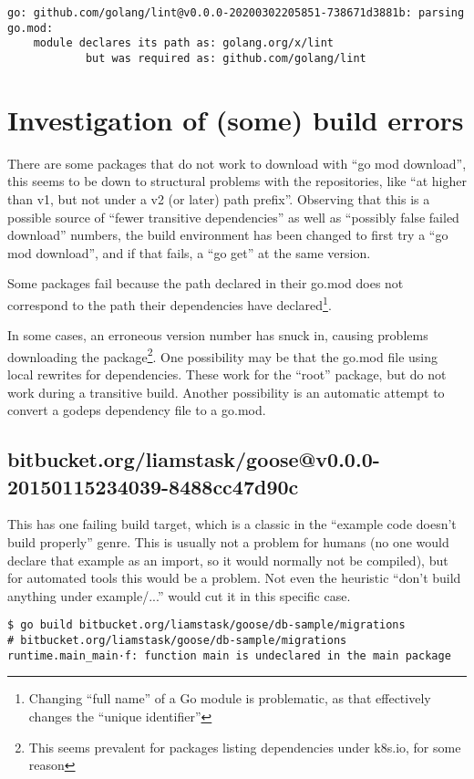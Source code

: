 \documentclass[a4paper]{paper}
\begin{document}
\begin{verbatim}
go: github.com/golang/lint@v0.0.0-20200302205851-738671d3881b: parsing go.mod:
	module declares its path as: golang.org/x/lint
	        but was required as: github.com/golang/lint
\end{verbatim}

\section{Investigation of (some) build errors}

There are some packages that do not work to download with ``go mod
download'', this seems to be down to structural problems with the
repositories, like ``at higher than v1, but not under a v2 (or later)
path prefix''. Observing that this is a possible source of ``fewer
transitive dependencies'' as well as ``possibly false failed
download'' numbers, the build environment has been changed to first
try a ``go mod download'', and if that fails, a ``go get'' at the same
version.

Some packages fail because the path declared in their go.mod does not
correspond to the path their dependencies have
declared\footnote{Changing ``full name'' of a Go module is
  problematic, as that effectively changes the ``unique identifier''}.

In some cases, an erroneous version number has snuck in, causing
problems downloading the package\footnote{This seems prevalent for
  packages listing dependencies under k8s.io, for some reason}. One
possibility may be that the go.mod file using local rewrites for
dependencies. These work for the ``root'' package, but do not work
during a transitive build. Another possibility is an automatic attempt
to convert a godeps dependency file to a go.mod.

\subsection{bitbucket.org/liamstask/goose@v0.0.0-20150115234039-8488cc47d90c}

This has one failing build target, which is a classic in the ``example
code doesn't build properly'' genre. This is usually not a problem for
humans (no one would declare that example as an import, so it would
normally not be compiled), but for automated tools this would be a
problem. Not even the heuristic ``don't build anything under
example/...'' would cut it in this specific case.

\begin{verbatim}
$ go build bitbucket.org/liamstask/goose/db-sample/migrations
# bitbucket.org/liamstask/goose/db-sample/migrations
runtime.main_main·f: function main is undeclared in the main package
\end{verbatim}
\end{document}
